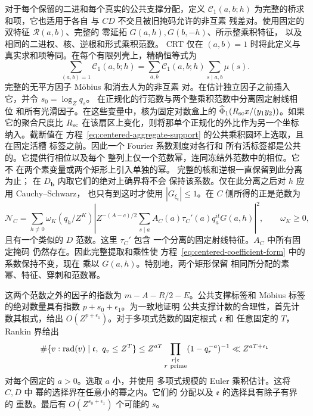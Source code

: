 \documentclass[11pt,a4paper]{article}
\numberwithin{equation}{section}
\numberwithin{figure}{section}
\theoremstyle{definition}
\theoremstyle{remark}
\begin{document}
对于每个保留的二进和每个真实的公共支撑分配，定义
\(\mathcal C_1(a,b;h)\) 为完整的桥求和项，它也适用于各自
与 \(CD\) 不交且被旧掩码允许的非互素
残差对。使用固定的双特征 \(\mathcal R(a,b)\)、完整的
零延拓 \(G(a,h),G(b,-h)\)、所示整乘积特征，
以及相同的二进权、核、逆根和形式乘积范数。
CRT 仅在 \((a,b)=1\) 时将此定义与
真实求和项等同。在每个有限列壳上，精确恒等式为
\[
 \sum_{(a,b)=1}\mathcal C_1(a,b;h)
 =\sum_{a,b}\mathcal C_1(a,b;h)\sum_{s\mid a,b}\mu(s).
\]
完整的无平方因子 M\"obius 和消去人为的非互素
对。在估计独立因子之前插入它，并令
\(s_0=\log_Zq_s\)。
在正规化的行范数与两个整乘积范数中分离固定射线相位
和所有光滑因子。在这些变量中，核为固定对数盒上的
\(\widehat\Phi_1(R_{\rm sc}x/(y_1y_2))\)。如果它的聚合尺度比 \(R_{\rm sc}\)
在该扇区上变化，则将那单个正规化的外比作为另一个坐标
纳入。截断值在
方程~\eqref{eq:centered-aggregate-support} 的公共乘积圆环上选取，且在固定活槽
标签之前。因此一个 Fourier 系数测度对各行和
所有活标签都是公共的。它提供行相位以及每个
整列上仅一个范数幂，连同冻结外范数中的相位。它不
在两个素变量或两个矩形上引入单独的幂。
完整的核和逆根一直保留到此分离为止；
在 \(D_{\mathbf b}\) 内取它们的绝对上确界将不会
保持该系数。仅在此分离之后对 \(h\) 应用 Cauchy--Schwarz，
也只有到这时才使用 \(|G_{\xi_{\mathfrak r}}|\le1\)。在 \(C\) 侧所得的正是范数为
\[
 \mathcal N_C=
 \sum_{h\ne0}\omega_K(q_h/Z^K)
 \left|Z^{-(A-c)/2}
   \sum_{s\mid a}A_C(a)\tau_C'(a)q_a^{it}G(a,h)\right|^2,
 \qquad \omega_K\ge0,
\]
且有一个类似的 \(D\) 范数。这里 \(\tau_C'\) 包含
一个分离的固定射线特征。\(A_C\) 中所有固定掩码
仍然存在。因此完整提取和乘性使
方程~\eqref{eq:centered-coefficient-form} 中的系数保持不变，现在
乘以 \(G(a,h)\)。特别地，两个矩形保留
相同所分配的素幂、特征、穿刺和范数幂。

这两个范数之外的因子的指数为
\(m-A-R/2-E\)。公共支撑标签和
M\"obius 标签的绝对数量具有指数 \(p+s_0+\epsilon_1\)。为一致地证明
公共支撑计数的合理性，首先计数其根式，给出
\(O(Z^{p+\epsilon_1})\)。对于多项式范数的固定根式 \(\mathfrak c\) 和
任意固定的 \(T\)，Rankin 界给出
\[
 \#\{v:\operatorname{rad}(v)\mid\mathfrak c,\ q_v\le Z^T\}
 \le Z^{aT}\prod_{\substack{r\mid\mathfrak c\\r\ {\rm prime}}}
             (1-q_r^{-a})^{-1}
 \ll Z^{aT+\epsilon_1}
\]
对每个固定的 \(a>0\)。选取 \(a\) 小，并使用
多项式规模的 Euler 乘积估计。这将 \(C,D\) 中
幂的选择界在任意小的幂之内。它们的
分配以及 \(\mathfrak e\) 的选择具有除子有界的
重数。最后有 \(O(Z^{s_0+\epsilon_1})\)
个可能的 \(s\)。
\end{document}
